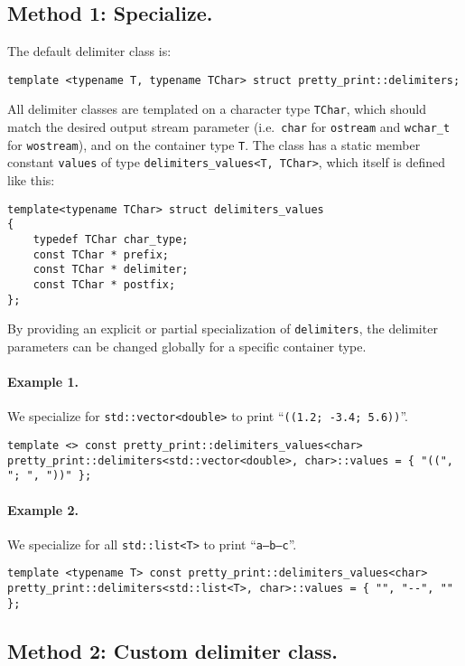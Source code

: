 \documentclass[a4paper,11pt]{article}
\begin{document}
\subsection*{Method 1: Specialize.} The default delimiter class
is: \begin{center}\texttt{template <typename T, typename TChar> struct
pretty\_print::delimiters;}\end{center} All delimiter classes are
templated on a character type \texttt{TChar}, which should match the
desired output stream parameter (i.e.\ \texttt{char} for
\texttt{ostream} and \texttt{wchar\_t} for \texttt{wostream}), and on
the container type \texttt{T}. The class has a static member constant
\texttt{values} of type \texttt{delimiters\_values<T, TChar>}, which itself is
defined like this:
\begin{verbatim}template<typename TChar> struct delimiters_values
{
    typedef TChar char_type;
    const TChar * prefix;
    const TChar * delimiter;
    const TChar * postfix;
};
\end{verbatim}
By providing an explicit or partial specialization of \texttt{delimiters},
the delimiter parameters can be changed globally for a specific container
type.

\paragraph{Example 1.} We specialize for \texttt{std::vector<double>}
to print ``\texttt{((1.2; -3.4; 5.6))}''.
\begin{verbatim}template <> const pretty_print::delimiters_values<char>
pretty_print::delimiters<std::vector<double>, char>::values = { "((", "; ", "))" };
\end{verbatim}

\paragraph{Example 2.} We specialize for all \texttt{std::list<T>} to print ``\texttt{a--b--c}''.
\begin{verbatim}template <typename T> const pretty_print::delimiters_values<char>
pretty_print::delimiters<std::list<T>, char>::values = { "", "--", "" };
\end{verbatim}

\subsection*{Method 2: Custom delimiter class.}
\end{document}
